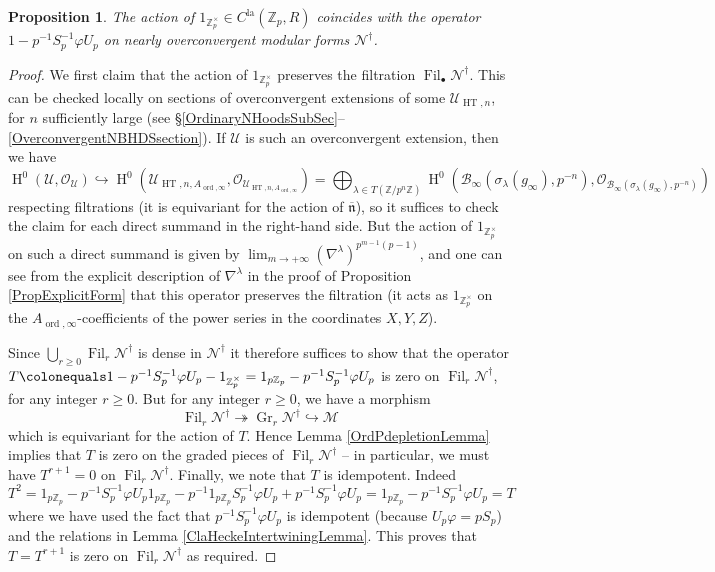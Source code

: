 \documentclass[10pt, oneside]{amsart}
\newcommand{\defeq}{\colonequals}
\numberwithin{equation}{subsection}
\newtheorem{proposition}[equation]{Proposition}
\theoremstyle{definition}
\theoremstyle{remark}
\newcommand{\mbb}[1]{\mathbb{#1}}
\newcommand{\opn}[1]{\operatorname{#1}}
\begin{document}
\begin{proposition}
    The action of $1_{\mbb{Z}_p^{\times}} \in C^{\opn{la}}(\mbb{Z}_p, R)$ coincides with the operator $1 - p^{-1}S_p^{-1}\varphi U_p$ on nearly overconvergent modular forms $\mathscr{N}^{\dagger}$.
\end{proposition}
\begin{proof}
    We first claim that the action of $1_{\mbb{Z}_p^{\times}}$ preserves the filtration $\opn{Fil}_{\bullet}\mathscr{N}^{\dagger}$. This can be checked locally on sections of overconvergent extensions of some $\mathcal{U}_{\opn{HT}, n}$, for $n$ sufficiently large (see \S \ref{OrdinaryNHoodsSubSec}--\ref{OverconvergentNBHDSsection}). If $\mathcal{U}$ is such an overconvergent extension, then we have
    \[
    \opn{H}^0(\mathcal{U}, \mathcal{O}_{\mathcal{U}}) \hookrightarrow \opn{H}^0(\mathcal{U}_{\opn{HT}, n, A_{\opn{ord}, \infty}}, \mathcal{O}_{\mathcal{U}_{\opn{HT}, n, A_{\opn{ord}, \infty}}} ) = \bigoplus_{\lambda \in T(\mbb{Z}/p^n\mbb{Z})} \opn{H}^0\left( \mathcal{B}_{\infty}(\sigma_{\lambda}(g_{\infty}), p^{-n}), \mathcal{O}_{\mathcal{B}_{\infty}(\sigma_{\lambda}(g_{\infty}), p^{-n})} \right)
    \]
    respecting filtrations (it is equivariant for the action of $\overline{\mathfrak{n}}$), so it suffices to check the claim for each direct summand in the right-hand side. But the action of $1_{\mbb{Z}_p^{\times}}$ on such a direct summand is given by $\lim_{m \to +\infty} (\nabla^{\lambda})^{p^{m-1}(p-1)}$, and one can see from the explicit description of $\nabla^{\lambda}$ in the proof of Proposition \ref{PropExplicitForm} that this operator preserves the filtration (it acts as $1_{\mbb{Z}_p^{\times}}$ on the $A_{\opn{ord}, \infty}$-coefficients of the power series in the coordinates $X, Y, Z$).

    Since $\bigcup_{r \geq 0} \opn{Fil}_r \mathscr{N}^{\dagger}$ is dense in $\mathscr{N}^{\dagger}$ it therefore suffices to show that the operator $T \defeq 1 - p^{-1}S_p^{-1}\varphi U_p - 1_{\mbb{Z}_p^{\times}} = 1_{p\mbb{Z}_p} - p^{-1}S_p^{-1}\varphi U_p$ is zero on $\opn{Fil}_r\mathscr{N}^{\dagger}$, for any integer $r \geq 0$. But for any integer $r \geq 0$, we have a morphism
    \[
    \opn{Fil}_r\mathscr{N}^{\dagger} \twoheadrightarrow \opn{Gr}_r \mathscr{N}^{\dagger} \hookrightarrow \mathscr{M}
    \]
    which is equivariant for the action of $T$. Hence Lemma \ref{OrdPdepletionLemma} implies that $T$ is zero on the graded pieces of $\opn{Fil}_r\mathscr{N}^{\dagger}$ -- in particular, we must have $T^{r+1} = 0$ on $\opn{Fil}_r\mathscr{N}^{\dagger}$. Finally, we note that $T$ is idempotent. Indeed
    \[
    T^2 = 1_{p\mbb{Z}_p} - p^{-1}S_p^{-1}\varphi U_p 1_{p \mbb{Z}_p} - p^{-1} 1_{p\mbb{Z}_p} S_p^{-1}\varphi U_p + p^{-1}S_p^{-1}\varphi U_p = 1_{p\mbb{Z}_p} - p^{-1}S_p^{-1}\varphi U_p = T  
    \]
    where we have used the fact that $p^{-1}S_p^{-1}\varphi U_p$ is idempotent (because $U_p \varphi = p S_p$) and the relations in Lemma \ref{ClaHeckeIntertwiningLemma}. This proves that $T = T^{r+1}$ is zero on $\opn{Fil}_r \mathscr{N}^{\dagger}$ as required. 
\end{proof}
\end{document}
